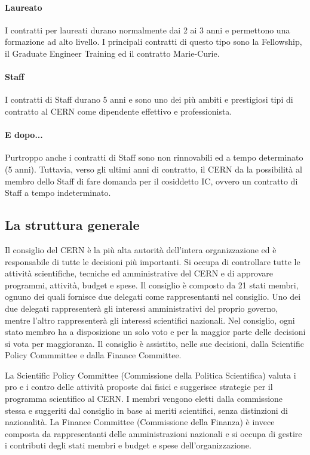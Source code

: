 			\paragraph{Laureato}I contratti per laureati durano normalmente dai 2 ai 3 anni e permettono una formazione ad alto livello. I principali contratti di questo tipo sono la Fellowship, il Graduate Engineer Training ed il contratto Marie-Curie.
			
			\paragraph{Staff}I contratti di Staff durano 5 anni e sono uno dei più ambiti e prestigiosi tipi di contratto al \ac{CERN} come dipendente effettivo e professionista.
			
			\paragraph{E dopo...}Purtroppo anche i contratti di Staff sono non rinnovabili ed a tempo determinato (5 anni). Tuttavia, verso gli ultimi anni di contratto, il \ac{CERN} da la possibilità al membro dello Staff di fare domanda per il cosiddetto \ac{IC}, ovvero un contratto di Staff a tempo indeterminato.
	
		\subsection{La struttura generale} \label{subsec:C;l;struttura}
		
			Il consiglio del \ac{CERN} è la più alta autorità dell'intera organizzazione ed è responsabile di tutte le decisioni più importanti. Si occupa di controllare tutte le attività scientifiche, tecniche ed amministrative del \ac{CERN} e di approvare programmi, attività, budget e spese. Il consiglio è composto da 21 stati membri, ognuno dei quali fornisce due delegati come rappresentanti nel consiglio. Uno dei due delegati rappresenterà gli interessi amministrativi del proprio governo, mentre l'altro rappresenterà gli interessi scientifici nazionali. Nel consiglio, ogni stato membro ha a disposizione un solo voto e per la maggior parte delle decisioni si vota per maggioranza. Il consiglio è assistito, nelle sue decisioni, dalla Scientific Policy Commmittee e dalla Finance Committee.
			
			La Scientific Policy Committee (Commissione della Politica Scientifica) valuta i pro e i contro delle attività proposte dai fisici e suggerisce strategie per il programma scientifico al \ac{CERN}. I membri vengono eletti dalla commissione stessa e suggeriti dal consiglio in base ai meriti scientifici, senza distinzioni di nazionalità. La Finance Committee (Commissione della Finanza) è invece composta da rappresentanti delle amministrazioni nazionali e si occupa di gestire i contributi degli stati membri e budget e spese dell'organizzazione.
			
